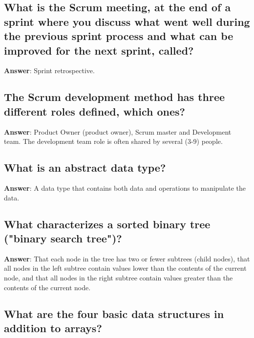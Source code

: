 \documentclass[a4paper,11pt,oneside]{article}
\begin{document}
\begin{sloppypar}
\subsection{What is the Scrum meeting, at the end of a sprint where you discuss what went well during the previous sprint process and what can be improved for the next sprint, called?}

\label{q:249:sa:en:True}

\textbf{Answer}: Sprint retrospective.



\subsection{The Scrum development method has three different roles defined, which ones?}

\label{q:250:sa:en:True}

\textbf{Answer}: Product Owner (product owner), Scrum master and Development team. The development team role is often shared by several (3-9) people.



\subsection{What is an abstract data type?}

\label{q:251:sa:en:True}

\textbf{Answer}: A data type that contains both data and operations to manipulate the data.



\subsection{What characterizes a sorted binary tree ("binary search tree")?}

\label{q:252:sa:en:True}

\textbf{Answer}: That each node in the tree has two or fewer subtrees (child nodes), that all nodes in the left subtree contain values ​​lower than the contents of the current node, and that all nodes in the right subtree contain values ​​greater than the contents of the current node.



\subsection{What are the four basic data structures in addition to arrays?}


\end{sloppypar}
\end{document}
